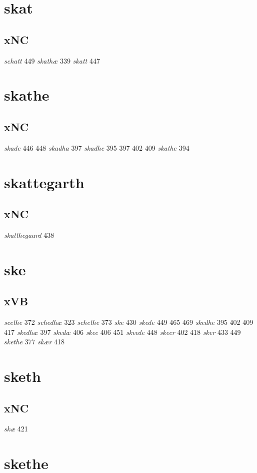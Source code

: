 \documentclass[a4paper,twocolumn]{article}
\begin{document}
\section{skat}
\label{sec:org2ef45db}
\subsection{xNC}
\label{sec:org16095f6}
\emph{schatt} 449 \emph{skathæ} 339 \emph{skatt} 447 
\section{skathe}
\label{sec:org88ad858}
\subsection{xNC}
\label{sec:orgd93b73e}
\emph{skade} 446 448 \emph{skadha} 397 \emph{skadhe} 395 397 402 409 \emph{skathe} 394 
\section{skattegarth}
\label{sec:orgbc2cc23}
\subsection{xNC}
\label{sec:org8901b19}
\emph{skatthegaard} 438 
\section{ske}
\label{sec:org8dd7ee3}
\subsection{xVB}
\label{sec:org424818c}
\emph{scethe} 372 \emph{schedhæ} 323 \emph{schethe} 373 \emph{ske} 430 \emph{skede} 449 465 469 \emph{skedhe} 395 402 409 417 \emph{skedhæ} 397 \emph{skedæ} 406 \emph{skee} 406 451 \emph{skeede} 448 \emph{skeer} 402 418 \emph{sker} 433 449 \emph{skethe} 377 \emph{skær} 418 
\section{sketh}
\label{sec:org2262ec5}
\subsection{xNC}
\label{sec:orgc788dcf}
\emph{skæ} 421 
\section{skethe}
\label{sec:org188cfb9}
\end{document}
